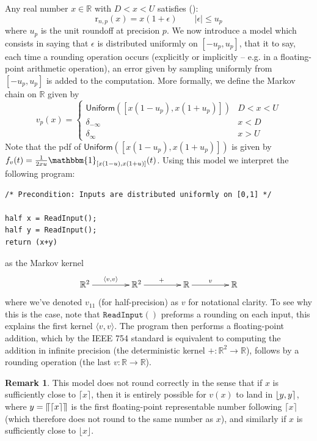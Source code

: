 \documentclass[10pt,a4paper]{article}
\theoremstyle{plain}
\theoremstyle{definition}
\newtheorem{remark}[theorem]{Remark}
\newcommand{\R}{\mathbb{R}}
\newcommand{\Round}[1][n,p]{\mathrm{r}_{#1}}
\newcommand{\one}{\mathbbm{1}}
\newcommand{\Unif}{\mathsf{Uniform}}
\newcommand{\ceil}[1]{\lceil #1 \rceil}
\newcommand{\floor}[1]{\lfloor #1 \rfloor}
\newcommand{\cceil}[1]{\llceil #1 \rrceil}
\newcommand{\fintvl}[1][x]{\mathlarger{\lfloor}#1,#1\mathlarger{\rceil}}
\newcommand{\absv}[1]{\vert #1\vert}
\newcommand{\uro}[1][p]{u_{#1}}
\begin{document}
Any real number $x\in\R$ with $D< x< U$ satisfies (\cite[Th. 2.2]{higham2002accuracy}):
\begin{equation}\label{eq:roundrelation}
\Round(x)=x(1+\epsilon)\qquad\absv{\epsilon}\leq \uro
\end{equation}
where $\uro$ is the unit roundoff at precision $p$. We now introduce a model which consists in saying that $\epsilon$ is distributed uniformly on $\left[ -\uro,\uro\right]$, that it to say, each time a rounding operation occurs (explicitly or implicitly -- e.g. in a floating-point arithmetic operation), an error given by sampling uniformly from $\left[ -\uro,\uro\right]$ is added to the computation. More formally, we define the Markov chain on $\R$ given by
\[
v_{p}(x)=\begin{cases}
\Unif\left(\left[x(1-\uro),x(1+\uro)\right]\right) & D<x<U\\
\delta_{-\infty}& x< D\\
\delta_{\infty} & x>U
\end{cases}
\]
Note that the pdf of $\Unif\left(\left[x(1-\uro),x(1+\uro)\right]\right)$ is given by $f_v(t)=\frac{1}{2xu}\one_{\left[x(1-u),x(1+u)\right]}(t)$. 
Using this model we interpret the following program:
\begin{lstlisting}
/* Precondition: Inputs are distributed uniformly on [0,1] */

half x = ReadInput();
half y = ReadInput();
return (x+y) 
\end{lstlisting}
as the Markov kernel
\[
\xymatrix@C=10ex
{
\R^2 \ar[r]^{\langle v,v\rangle} & \R^2\ar[r]^{+} & \R\ar[r]^{v} & \R
}
\]
where we've denoted $v_{11}$ (for half-precision) as $v$ for notational clarity. To see why this is the case, note that $\mathtt{ReadInput()}$ preforms a rounding on each input, this explains the first kernel $\langle v,v\rangle$. The program then performs a floating-point addition, which by the IEEE 754 standard is equivalent to computing the addition in infinite precision (the deterministic kernel $+:\R^2\to\R$), follows by a rounding operation (the last $v:\R\to\R$).

\begin{remark}
This model does not round correctly in the sense that if $x$ is sufficiently close to $\ceil{x}$, then it is entirely possible for $v(x)$ to land in $\fintvl[y]$, where $y=\cceil{\ceil{x}}$ is the  first floating-point representable number following $\ceil{x}$ (which therefore does not round to the same number as $x$), and similarly if $x$ is sufficiently close to $\floor{x}$.
\end{remark}
\end{document}
